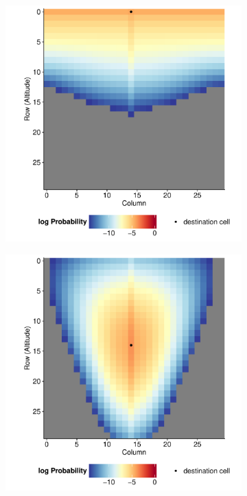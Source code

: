 \documentclass[11pt]{article}
\begin{document}
\newpage
\begin{figure}[!hbtp]

	\begin{subfigure}{.5\textwidth}
		\centering
		\includegraphics[width=1\linewidth]{../Results/DispMaps/AreaNoTemp100Top.pdf}
	\end{subfigure}
	\begin{subfigure}{.5\textwidth}
		\centering
		\includegraphics[width=1\linewidth]{../Results/DispMaps/AreaNoTemp100.pdf}
	\end{subfigure}
	

\end{figure}
\end{document}
